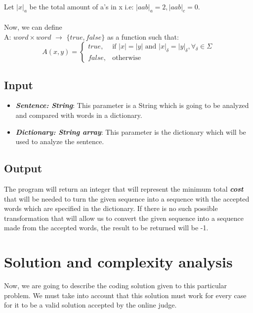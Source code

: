 \documentclass{article}
\begin{document}
\begin{itemize}
		\\
		Let $|x|_a$ be the total amount of a's in x
		i.e: $|aab|_a = 2, |aab|_c = 0$.
		\\
		\\
		Now, we can define
		\\
		A: $word \times word$ $\to$ $\{true, false\}$
		as a function such that:
			\[
				A(x,y)=
			\begin{cases}
				true, & \text{if } |x| = |y| \text{ and } |x|_\delta = |y|_\delta, \forall_\delta \in \Sigma
				\\
				false, & \text{otherwise}
			\end{cases}
			\]
	\end{itemize}
	\subsection{Input}
	\begin{itemize}
		\item \emph{\textbf{Sentence: String}}: This parameter is
		a String which is going to be analyzed and compared with
		words in a dictionary.
		
		\item \emph{\textbf{Dictionary: String array}}: This
		parameter is the dictionary which will be used to
		analyze the sentence.
	\end{itemize}
	\subsection{Output}
	The program will return an integer that will represent the
	minimum total \emph{\textbf{cost}} that will be needed to turn the given
	sequence into a sequence with the accepted words which are
	specified in the dictionary. If there is no such possible
	transformation that will allow us to convert the given
	sequence into a sequence made from the accepted words,
	the result to be returned will be -1.
	\section{Solution and complexity analysis}
	Now, we are going to describe the coding solution given
	to this particular problem. We must take into account that
	this solution must work for every case for it to be a valid
	solution accepted by the online judge.
\end{document}
